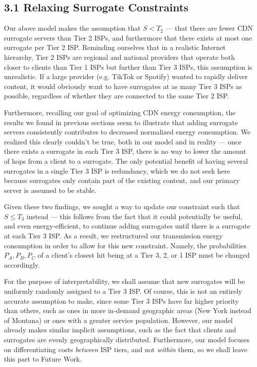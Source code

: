 \documentclass[
	a4paper, %
	10pt, %
	unnumberedsections, %
	twoside, %
]{LTJournalArticle}
\begin{document}
\subsection{3.1 Relaxing Surrogate Constraints}
Our above model makes the assumption that $S < T_2$ --- that there are fewer CDN surrogate servers than Tier 2 ISPs, and furthermore that there exists at most one surrogate per Tier 2 ISP. Reminding ourselves that in a realistic Internet hierarchy, Tier 2 ISPs are regional and national providers that operate both closer to clients than Tier 1 ISPs but further than Tier 3 ISPs, this assumption is unrealistic. If a large provider (e.g. TikTok or Spotify) wanted to rapidly deliver content, it would obviously want to have surrogates at as many Tier 3 ISPs as possible, regardless of whether they are connected to the same Tier 2 ISP. 

Furthermore, recalling our goal of optimizing CDN energy consumption, the results we found in previous sections seem to illustrate that adding surrogate servers consistently contributes to decreased normalized energy consumption. We realized this clearly couldn't be true, both in our model and in reality --- once there exists a surrogate in each Tier 3 ISP, there is no way to lower the amount of hops from a client to a surrogate. The only potential benefit of having several surrogates in a single Tier 3 ISP is redundancy, which we do not seek here because surrogates only contain part of the existing content, and our primary server is assumed to be stable. 

Given these two findings, we sought a way to update our constraint such that $S \leq T_3$ instead --- this follows from the fact that it could potentially be useful, and even energy-efficient, to continue adding surrogates until there is a surrogate at each Tier 3 ISP. As a result, we restructured our transmission energy consumption in order to allow for this new constraint. Namely, the probabilities $P_A, P_B, P_C$ of a client's closest hit being at a Tier 3, 2, or 1 ISP must be changed accordingly. 

For the purpose of interpretability, we shall assume that new surrogates will be uniformly randomly assigned to a Tier 3 ISP. Of course, this is not an entirely accurate assumption to make, since some Tier 3 ISPs have far higher priority than others, such as ones in more in-demand geographic areas (New York instead of Montana) or ones with a greater service population. However, our model already makes similar implicit assumptions, such as the fact that clients and surrogates are evenly geographically distributed. Furthermore, our model focuses on differentiating costs \textit{between} ISP tiers, and not \textit{within} them, so we shall leave this part to Future Work.
\end{document}
